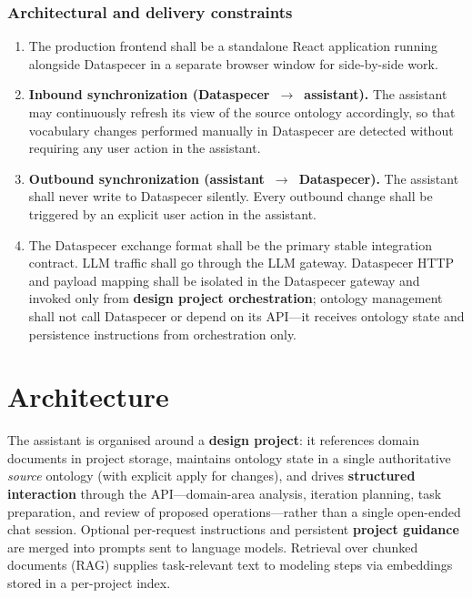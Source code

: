 \documentclass{article}
\def\twodigits#1{%
    \ifnum#1<10 0\fi
    \number#1}%
\begin{document}
\subsubsection*{Architectural and delivery constraints}
\begin{enumerate}[resume,label=\textbf{NFR-\protect\twodigits{\arabic*}:},align=left,leftmargin=1.5cm]
  \item The production frontend shall be a standalone React application running alongside Dataspecer in a separate browser window for side-by-side work.
\item \textbf{Inbound synchronization (Dataspecer~$\rightarrow$~assistant).} The assistant may continuously refresh its view of the source ontology accordingly, so that vocabulary changes performed manually in Dataspecer are detected without requiring any user action in the assistant.
  \item \textbf{Outbound synchronization (assistant~$\rightarrow$~Dataspecer).} The assistant shall never write to Dataspecer silently. Every outbound change shall be triggered by an explicit user action in the assistant.  
  \item The Dataspecer exchange format shall be the primary stable integration contract. LLM traffic shall go through the LLM gateway. Dataspecer HTTP and payload mapping shall be isolated in the Dataspecer gateway and invoked only from \textbf{design project orchestration}; ontology management shall not call Dataspecer or depend on its API---it receives ontology state and persistence instructions from orchestration only.
\end{enumerate}

\section{Architecture}

The assistant is organised around a \textbf{design project}: it references domain documents in project storage, maintains ontology state in a single authoritative \emph{source} ontology (with explicit apply for changes), and drives \textbf{structured interaction} through the API---domain-area analysis, iteration planning, task preparation, and review of proposed operations---rather than a single open-ended chat session. Optional per-request instructions and persistent \textbf{project guidance} are merged into prompts sent to language models. Retrieval over chunked documents (RAG) supplies task-relevant text to modeling steps via embeddings stored in a per-project index.
\end{document}
